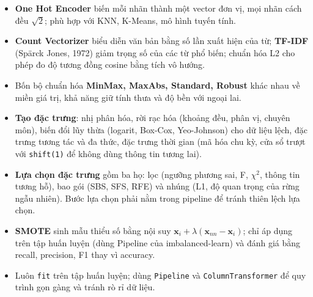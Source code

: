 \begin{itemize}
    \item \textbf{One Hot Encoder} biến mỗi nhãn thành một vector đơn vị, mọi nhãn cách đều $\sqrt{2}$; phù hợp với KNN, K-Means, mô hình tuyến tính.
    \item \textbf{Count Vectorizer} biểu diễn văn bản bằng số lần xuất hiện của từ; \textbf{TF-IDF} (Spärck Jones, 1972) giảm trọng số của các từ phổ biến; chuẩn hóa L2 cho phép đo độ tương đồng cosine bằng tích vô hướng.
    \item Bốn bộ chuẩn hóa \textbf{MinMax, MaxAbs, Standard, Robust} khác nhau về miền giá trị, khả năng giữ tính thưa và độ bền với ngoại lai.
    \item \textbf{Tạo đặc trưng}: nhị phân hóa, rời rạc hóa (khoảng đều, phân vị, chuyên môn), biến đổi lũy thừa (logarit, Box-Cox, Yeo-Johnson) cho dữ liệu lệch, đặc trưng tương tác và đa thức, đặc trưng thời gian (mã hóa chu kỳ, cửa sổ trượt với \texttt{shift(1)} để không dùng thông tin tương lai).
    \item \textbf{Lựa chọn đặc trưng} gồm ba họ: lọc (ngưỡng phương sai, F, $\chi^2$, thông tin tương hỗ), bao gói (SBS, SFS, RFE) và nhúng (L1, độ quan trọng của rừng ngẫu nhiên). Bước lựa chọn phải nằm trong pipeline để tránh thiên lệch lựa chọn.
    \item \textbf{SMOTE} sinh mẫu thiểu số bằng nội suy $\mathbf{x}_i + \lambda(\mathbf{x}_{nn} - \mathbf{x}_i)$; chỉ áp dụng trên tập huấn luyện (dùng Pipeline của imbalanced-learn) và đánh giá bằng recall, precision, F1 thay vì accuracy.
    \item Luôn \texttt{fit} trên tập huấn luyện; dùng \texttt{Pipeline} và \texttt{ColumnTransformer} để quy trình gọn gàng và tránh rò rỉ dữ liệu.
\end{itemize}

